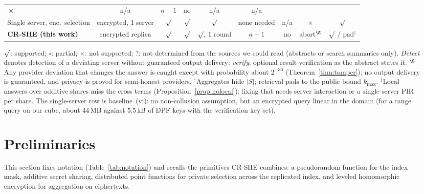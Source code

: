 \documentclass[a4paper,fleqn]{cas-sc}
\providecommand{\checkmark}{\ensuremath{\surd}}
\begin{document}
\begin{table}[pos=t,width=\textwidth]
\begin{tabular*}{\tblwidth}{@{\extracolsep{\fill}}lcccccccc@{}}
$\times^{\ddagger}$ & n/a & $n-1$ & no & n/a & n/a \\
Single server, enc.\ selection & encrypted, 1 server & $\checkmark$ &
$\checkmark$ & $\checkmark$ & none needed & n/a & $\times$ & $\checkmark$ \\
\textbf{CR-SHE (this work)} & encrypted replica & $\checkmark$ & $\checkmark$ &
$\checkmark$, 1 round & $n-1$ & no & abort$^{\S}$ & $\checkmark$ / pad$^{\dagger}$ \\
\bottomrule
\end{tabular*}
\vspace{3pt}
\begin{flushleft}
\footnotesize
$\checkmark$: supported; $\circ$: partial; $\times$: not supported; ?: not
determined from the sources we could read (abstracts or search summaries
only).
\emph{Detect} denotes detection of a deviating server without guaranteed
output delivery; \emph{verify}, optional result verification as the abstract
states it. $^{\S}$Any provider deviation that changes the answer is caught
except with probability about $2^{-36}$ (Theorem~\ref{thm:tamper}); no output
delivery is guaranteed, and privacy is proved for semi-honest providers. $^{\dagger}$Aggregates hide $|S|$; retrieval pads to the
public bound $k_{\max}$. $^{\ddagger}$Local answers over additive shares miss
the cross terms (Proposition~\ref{prop:nolocal}); fixing that needs server
interaction or a single-server PIR per share. The single-server row is
baseline~(vi): no non-collusion assumption, but an encrypted query linear in
the domain (for a range query on our cube, about $44$\,MB against $5.5$\,kB of
DPF keys with the verification key set).
\end{flushleft}
\end{table}

\section{Preliminaries}
\label{sec:prelim}

This section fixes notation (Table~\ref{tab:notation}) and recalls the
primitives CR-SHE combines: a pseudorandom function for the index mask,
additive secret sharing, distributed point functions for private selection
across the replicated index, and leveled homomorphic encryption for
aggregation on ciphertexts.
\end{document}
